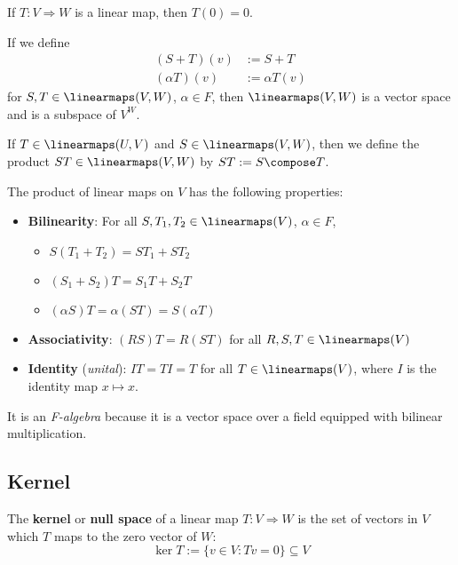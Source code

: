\begin{lemma} If $T : V \Rightarrow W$ is a linear map, then $T(0) = 0$.
\end{lemma}

\begin{theorem}
  If we define
  \begin{align*}
    (S + T)(v) &:= S + T \\ 
    (\alpha T)(v) &:= \alpha T(v)
  \end{align*}
  for $S, T \in \linearmaps(V,W)$, $\alpha \in F$, then $\linearmaps(V,W)$ is a vector space and is a subspace of $V^W$.
\end{theorem}

\begin{definition}
  If $T \in \linearmaps(U, V)$ and $S \in \linearmaps(V, W)$, then we define the product $ST \in \linearmaps(V, W)$ by $ST := S \compose T$.
\end{definition}

\begin{theorem}
  The product of linear maps on $V$ has the following properties:
  \begin{itemize}
    \item \textbf{Bilinearity}: For all $S, T_1, T_2 \in \linearmaps(V)$, $\alpha \in F$,
    \begin{itemize}
      \item $S(T_1 + T_2) = ST_1 + ST_2$
      \item $(S_1 + S_2)T = S_1 T + S_2 T$
      \item $(\alpha S)T = \alpha(ST) = S(\alpha T)$
    \end{itemize}
    \item \textbf{Associativity}: $(RS)T = R(ST)$ for all $R, S, T \in \linearmaps(V)$
    \item \textbf{Identity} (\textit{unital}): $IT = TI = T$ for all $T \in \linearmaps(V)$, where $I$ is the identity map $x \mapsto x$.
  \end{itemize}
  It is an \textit{F-algebra} because it is a vector space over a field equipped with bilinear multiplication.
\end{theorem}

\subsection{Kernel}

\begin{definition}[Kernel]
  The \textbf{kernel} or \textbf{null space} of a linear map $T : V \Rightarrow W$ is the set of vectors in $V$ which $T$ maps to the zero vector of $W$:
  \[
    \ker T := \{ v \in V : Tv = 0 \} \subseteq V
  \]
\end{definition}

